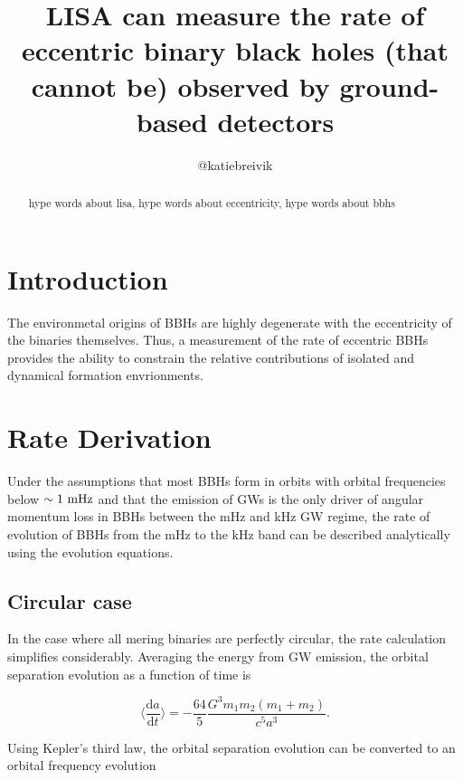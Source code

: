 \documentclass[twocolumn]{aastex631}
\begin{document}
\title{LISA can measure the rate of eccentric binary black holes (that cannot be) observed by ground-based detectors}

\author{@katiebreivik}

\begin{abstract}
    hype words about lisa, hype words about eccentricity, hype words about bbhs
\end{abstract}

\section{Introduction}
\label{sec:intro}

The environmetal origins of BBHs are highly degenerate with the eccentricity of the binaries themselves. Thus, a measurement of the rate of eccentric BBHs provides the ability to constrain the relative contributions of isolated and dynamical formation envrionments. 

\section{Rate Derivation}
\label{sec:rates}

Under the assumptions that most BBHs form in orbits with orbital frequencies below $\sim 1~\rm{mHz}$ and that the emission of GWs is the only driver of angular momentum loss in BBHs between the mHz and kHz GW regime, the rate of evolution of BBHs from the mHz to the kHz band can be described analytically using the \citet{Peters1964} evolution equations.


\subsection{Circular case}
\label{sec:circ}
In the case where all mering binaries are perfectly circular, the rate calculation simplifies considerably. Averaging the energy from GW emission, the orbital separation evolution as a function of time is

\begin{equation}
    \Big\langle \frac{\mathrm{d}a}{\mathrm{d}t} \Big\rangle = - \frac{64}{5} \frac{G^3 m_1 m_2 (m_1 + m_2)}{c^5 a^3}.
    \label{eq:dadt_circ}
\end{equation}

Using Kepler's third law, the orbital separation evolution can be converted to an orbital frequency evolution
\end{document}
